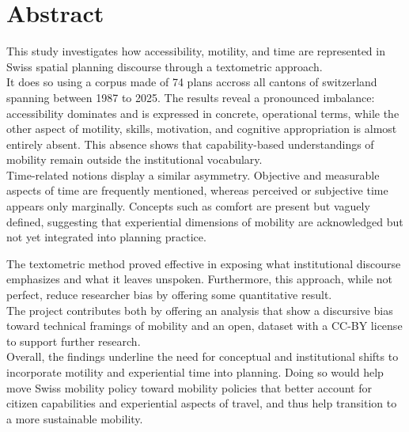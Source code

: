 \documentclass[a4paper, 11 pt]{article}
\begin{document}
{ %

\newpage
\section*{Abstract}
This study investigates how accessibility, motility, and time are represented in Swiss spatial planning discourse through a textometric approach.\\ It does so using a corpus made of 74 plans accross all cantons of switzerland spanning between 1987 to 2025.
The results reveal a pronounced imbalance: accessibility dominates and is expressed in concrete, operational terms, while the other aspect of motility,  skills, motivation, and cognitive appropriation is almost entirely absent. This absence shows that capability-based understandings of mobility remain outside the institutional vocabulary.\\
Time-related notions display a similar asymmetry. Objective and measurable aspects of time are frequently mentioned, whereas perceived or subjective time appears only marginally. Concepts such as comfort are present but vaguely defined, suggesting that experiential dimensions of mobility are acknowledged but not yet integrated into planning practice.

The textometric method proved effective in exposing what institutional discourse emphasizes and what it leaves unspoken. Furthermore, this approach, while not perfect, reduce researcher bias by offering some quantitative result.\\
The project contributes both by offering an analysis that show a discursive bias toward technical framings of mobility and an open, dataset with a CC-BY license to support further research.\\
Overall, the findings underline the need for conceptual and institutional shifts to incorporate motility and experiential time into planning. Doing so would help move Swiss mobility policy toward mobility policies that better account for citizen capabilities and experiential aspects of travel, and thus help transition to a more sustainable mobility.

\newpage
}
\newpage
\renewcommand{\contentsname}{Table of Contents} 
{
  \hypersetup{linkcolor=black}
  \tableofcontents
}
\newpage

 









\newpage
 

\end{document}
